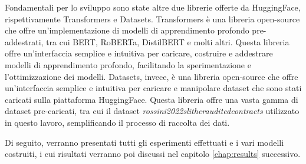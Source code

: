\documentclass[../../Thesis.tex]{subfiles}
\begin{document}
Fondamentali per lo sviluppo sono state altre due librerie offerte da HuggingFace, rispettivamente Transformers e Datasets. Transformers è una libreria open-source che offre un'implementazione di modelli di apprendimento profondo pre-addestrati, tra cui BERT, RoBERTa, DistilBERT e molti altri. Questa libreria offre un'interfaccia semplice e intuitiva per caricare, costruire e addestrare modelli di apprendimento profondo, facilitando la sperimentazione e l'ottimizzazione dei modelli. Datasets, invece, è una libreria open-source che offre un'interfaccia semplice e intuitiva per caricare e manipolare dataset che sono stati caricati sulla piattaforma HuggingFace. Questa libreria offre una vasta gamma di dataset pre-caricati, tra cui il dataset \textit{rossini2022slitherauditedcontracts} utilizzato in questo lavoro, semplificando il processo di raccolta dei dati. 

Di seguito, verranno presentati tutti gli esperimenti effettuati e i vari modelli costruiti, i cui risultati verranno poi discussi nel capitolo \ref{chap:results} successivo.
\end{document}
